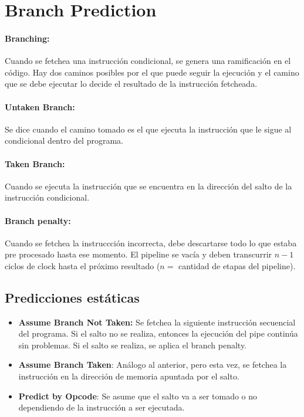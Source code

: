 \newpage
\section{Branch Prediction}\label{sec::branchPrediction}

\paragraph{Branching:} Cuando se fetchea una instrucción condicional, se genera una ramificación en el código. Hay dos caminos posibles por el que puede seguir la ejecución y el camino que se debe ejecutar lo decide el resultado de la instrucción fetcheada. 

\paragraph{Untaken Branch:} Se dice cuando el camino tomado es el que ejecuta la instrucción que le sigue al condicional dentro del programa.

\paragraph{Taken Branch:} Cuando se ejecuta la instrucción que se encuentra en la dirección del salto de la instrucción condicional.

\paragraph{Branch penalty:} Cuando se fetchea la instruccción incorrecta, debe descartarse todo lo que estaba pre procesado hasta ese momento. El pipeline se vacía y deben transcurrir $n-1$ ciclos de clock hasta el próximo resultado ($n = $ cantidad de etapas del pipeline).

\subsection{Predicciones estáticas}
\begin{itemize}
	\item \textbf{Assume Branch Not Taken:}  Se fetchea la siguiente instrucción secuencial del programa. Si el salto no se realiza, entonces la ejecución del pipe continúa sin problemas. Si el salto se realiza, se aplica el branch penalty.
	\item \textbf{Assume Branch Taken}: Análogo al anterior, pero esta vez, se fetchea la instrucción en la dirección de memoria apuntada por el salto.
	\item \textbf{Predict by Opcode}: Se asume que el salto va a ser tomado o no dependiendo de la instrucción a ser ejecutada.
\end{itemize}

